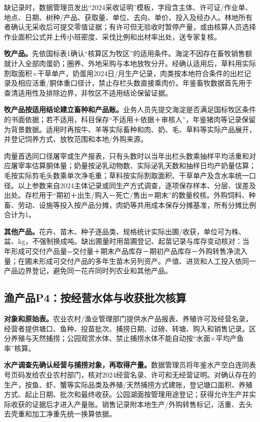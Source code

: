 \documentclass[12pt,a4paper,fontset=fandol]{ctexart}
\begin{document}
缺记录时，数据管理员发出“2024采收证明”模板，字段含主体、许可证/作业单、地点、日期、树种/产品、获取量、单位、去向、单价、投入及经办人。林地所有者确认无采收后可提交零值证据；有许可但无验收时暂停产量，或由核算人员选择作业面积公式并上传小班密度、采伐比例和出材率出处，送专家复核。

\textbf{牧产品。}先依国标表1确认“核算区为牧区”的适用条件。海淀不因存在畜牧销售额就计入全部肉蛋奶；圈养、外地采购与本地放牧分开。经确认适用后，草料用实际割取面积×干草单产，奶蛋用2024日/月生产记录，肉类按本地符合条件的出栏记录及相应活重/胴体重口径计，禁止存栏头数直接乘肉价。年鉴畜牧数据首先用于查清适用性及排除边界，非牧区不适用结论保留证据。

\textbf{牧产品按适用结论建立畜种和产品账。}业务人员先提交海淀是否满足国标牧区条件的书面依据；若不适用，科目保存“不适用＋依据＋审核人”，年鉴猪肉等记录保留为背景数据。适用时再按牛、羊等实际畜种和肉、奶、毛、草料等实际产品展开，并登记饲养方式、放牧范围和本地/外购来源。

肉量首选同口径屠宰或生产报表，只有头数时以当年出栏头数乘抽样平均活重和对应屠宰率估算胴体量；奶量按泌乳动物数、实际泌乳天数和抽样日均产奶量估算；毛按实际剪毛头数乘单次净毛重；草料按实际割取面积、干草单产及含水率统一口径。以上参数来自2024主体记录或同生产方式调查，逐项保存样本、分层、误差及出处。存栏用于“期初＋出生/购入－死亡/售出＝期末”的数量校核。外购饲料、种畜、劳动、设施等投入按产品分摊，肉奶等共用成本保存分摊基准，所有分摊比例合计为1。

\textbf{其他产品。}花卉、苗木、种子逐品类、规格统计实际出圃/收获，单位可为株、盆、kg，不强制换成吨。缺出圃量时用苗圃登记、起苗记录与库存变动核对：当年形成可交付产品量=交付量＋期末产品库存－期初产品库存－外购转售净流入量；在圃未形成可交付产品的多年生苗木另列资产。产值、进货和人工投入依同一产品边界登记，避免同一花卉同时列农业和其他产品。

\subsection{渔产品P4：按经营水体与收获批次核算}
\textbf{对象和原始表。}农业农村/渔业管理部门提供水产品报表、养殖许可及经营名录，经营者提供塘口、鱼种、投苗批次、捕捞日期、过磅、转塘、购入和销售记录。区分养殖与天然捕捞；公园观赏水体、禁止捕捞水体不能自动按“水面×平均产鱼率”核算。

\textbf{水产调查先确认经营与捕捞对象，再取得产量。}数据管理员将年鉴水产空白连同表号页码发给农业农村部门，核对2024经营名录、许可和无经营证明。对确认存在的生产，按鱼、虾、蟹等实际品类及养殖/天然捕捞方式建账，登记塘口面积、养殖方式、起止日期、批次和最终收获。公园湖面按管理用途登记；获得允许生产并实际收获的证据后才进入产量账。销售记录附本地生产/外购转售标记，活重、去头去壳重和加工净重先统一换算依据。
\end{document}
